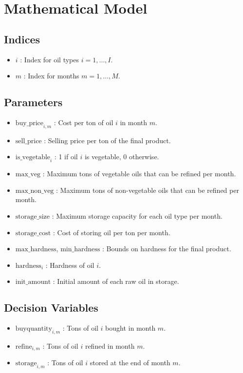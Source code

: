 \documentclass{article}
\begin{document}
\section*{Mathematical Model}

\subsection*{Indices}
\begin{itemize}
    \item \(i\) : Index for oil types \(i = 1, \dots, I\).
    \item \(m\) : Index for months \(m = 1, \dots, M\).
\end{itemize}

\subsection*{Parameters}
\begin{itemize}
    \item \( \text{buy\_price}_{i,m} \) : Cost per ton of oil \(i\) in month \(m\).
    \item \(\text{sell\_price}\) : Selling price per ton of the final product.
    \item \(\text{is\_vegetable}_i\) : 1 if oil \(i\) is vegetable, 0 otherwise.
    \item \(\text{max\_veg}\) : Maximum tons of vegetable oils that can be refined per month.
    \item \(\text{max\_non\_veg}\) : Maximum tons of non-vegetable oils that can be refined per month.
    \item \(\text{storage\_size}\) : Maximum storage capacity for each oil type per month.
    \item \(\text{storage\_cost}\) : Cost of storing oil per ton per month.
    \item \(\text{max\_hardness}\), \(\text{min\_hardness}\) : Bounds on hardness for the final product.
    \item \(\text{hardness}_i\) : Hardness of oil \(i\).
    \item \(\text{init\_amount}\) : Initial amount of each raw oil in storage.
\end{itemize}

\subsection*{Decision Variables}
\begin{itemize}
    \item \( \text{buyquantity}_{i,m} \) : Tons of oil \(i\) bought in month \(m\).
    \item \( \text{refine}_{i,m} \) : Tons of oil \(i\) refined in month \(m\).
    \item \( \text{storage}_{i,m} \) : Tons of oil \(i\) stored at the end of month \(m\).
\end{itemize}
\end{document}
